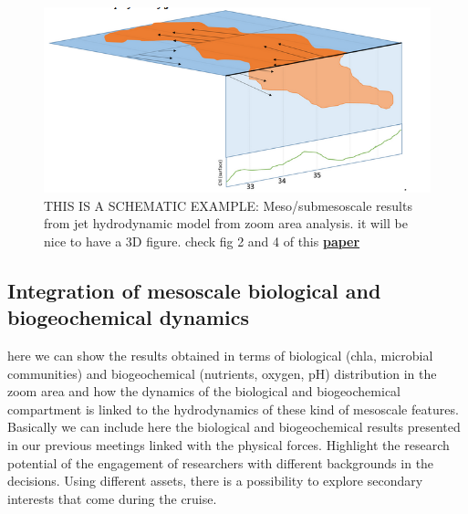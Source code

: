 \begin{figure}
    \centering
    \includegraphics[width=1\linewidth]{figs/3d_results.png}
    \caption{THIS IS A SCHEMATIC EXAMPLE: Meso/submesoscale results from jet hydrodynamic model from zoom area analysis. it will be nice to have a 3D figure. check fig 2 and 4 of this \href{https://journals.ametsoc.org/view/journals/bams/101/11/bamsD190305.xml?tab_body=fulltext-display}{\textbf{paper}}}
    \label{fig:block}
\end{figure}

\subsection{Integration of mesoscale biological and biogeochemical dynamics}

here we can show the results obtained in terms of biological (chla, microbial communities) and biogeochemical (nutrients, oxygen, pH) distribution in the zoom area and how the dynamics of the biological and biogeochemical compartment is linked to the hydrodynamics of these kind of mesoscale features.  Basically we can include here the biological and biogeochemical results presented in our previous meetings linked with the physical forces. 
Highlight the research potential of the engagement of researchers with different backgrounds in the decisions. Using different assets, there is a possibility to explore secondary interests that come during the cruise. \\

\begin{figure}
    \centering
    \label{fig:block}
\end{figure}